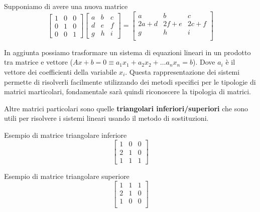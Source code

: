 Supponiamo di avere una nuova matrice
\begin{equation*}
    \left[\begin{array}{ccc}
        1 & 0 & 0 \\
        0 & 1 & 0 \\
        0 & 0 & 1
    \end{array}\right]  \left[\begin{array}{ccc}
        a & b & c \\
        d & e & f \\
        g & h & i
    \end{array}\right] = \left[\begin{array}{ccc}
        a & b & c \\
        2a+d & 2f+e & 2c+f \\
        g & h & i \\
    \end{array}\right] 
\end{equation*}

In aggiunta possiamo trasformare un sistema di equazioni lineari in un prodotto 
tra matrice e vettore ($Ax+b=0\equiv a_1x_1+a_2x_2+\dots a_n x_n = b$). Dove $a_i$
è il vettore dei coefficienti della variabile $x_i$. Questa rappresentazione dei
sistemi permette di risolverli facilmente utilizzando dei metodi specifici per le 
tipologie di matrici marticolari, fondamentale sarà quindi riconoscere la tipologia
di matrici.

Altre matrici particolari sono quelle \textbf{triangolari inferiori/superiori} che sono
utili per risolvere i sistemi lineari usando il metodo di sostituzioni.

\begin{esempio}
    Esempio di matrice triangolare inferiore
    \begin{equation*}
        \left[\begin{array}{ccc}
            1 & 0 & 0 \\
            2 & 1 & 0 \\
            1 & 1 & 1
        \end{array}\right] 
    \end{equation*}
\end{esempio}

\begin{esempio}
    Esempio di matrice triangolare superiore
    \begin{equation*}
        \left[\begin{array}{ccc}
            1 & 1 & 1 \\
            2 & 1 & 0 \\
            1 & 0 & 0 \\
        \end{array}\right] 
    \end{equation*}
\end{esempio}

